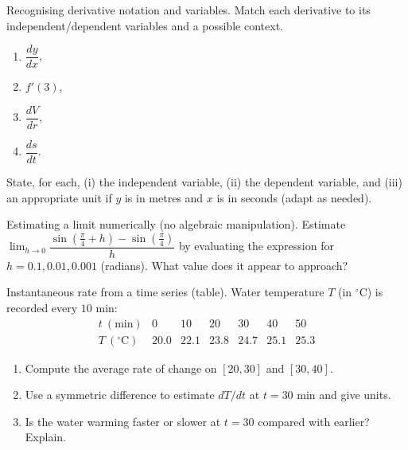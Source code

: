 \documentclass[11pt]{article}
\def\textbf#1{#1}%
\newcounter{question}
\begin{document}
\begin{question}
\textbf{Recognising derivative notation and variables.}
Match each derivative to its independent/dependent variables and a possible context.
\begin{enumerate}
  \item $\dfrac{dy}{dx}$, \quad \ \ \item $f'(3)$, \quad \ \ \item $\dfrac{dV}{dr}$, \quad \ \ \item $\dfrac{ds}{dt}$.
\end{enumerate}
State, for each, (i) the independent variable, (ii) the dependent variable, and (iii) an appropriate unit if $y$ is in metres and $x$ is in seconds (adapt as needed).
\end{question}

\begin{question}
\textbf{Estimating a limit numerically (no algebraic manipulation).}
Estimate $\displaystyle\lim_{h\to 0}\dfrac{\sin(\tfrac{\pi}{4}+h)-\sin(\tfrac{\pi}{4})}{h}$ by evaluating the expression for $h=0.1,0.01,0.001$ (radians). What value does it appear to approach?
\end{question}

\begin{question}
\textbf{Instantaneous rate from a time series (table).}
Water temperature $T$ (in $^\circ$C) is recorded every $10$ min:
\[
\begin{array}{c|cccccc}
t\ (\text{min}) & 0 & 10 & 20 & 30 & 40 & 50\\\hline
T\ (^\circ\text{C}) & 20.0 & 22.1 & 23.8 & 24.7 & 25.1 & 25.3
\end{array}
\]
\begin{enumerate}
  \item Compute the average rate of change on $[20,30]$ and $[30,40]$.
  \item Use a symmetric difference to estimate $dT/dt$ at $t=30$ min and give units.
  \item Is the water warming faster or slower at $t=30$ compared with earlier? Explain.
\end{enumerate}
\end{question}
\end{document}
